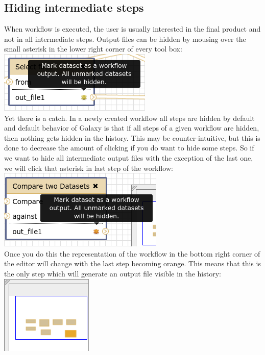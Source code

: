 \documentclass[11pt,a4paper]{article}
\begin{document}
\subsection{Hiding intermediate steps}
When workflow is executed, the user is usually interested in the final product and not in all intermediate steps. Output files can be hidden by mousing over the small asterisk in the lower right corner of every tool box:\\
\includegraphics[scale=0.55]{figures/101_29}\\
Yet there is a catch. In a newly created workflow all steps are hidden by default and default behavior of Galaxy is that if all steps of a given workflow are hidden, then nothing gets hidden in the history. This may be
counter-intuitive, but this is done to decrease the amount of clicking if you do want to hide some steps. So if we want to hide all intermediate output files with the exception of the last one, we will click that asterisk
in last step of the workflow:\\
\includegraphics[scale=0.55]{figures/101_30}\\
Once you do this the representation of the workflow in the bottom right corner of the editor will change with the last step becoming orange. This means that this is the only step which will generate an output file visible in the history:\\
\includegraphics[scale=0.55]{figures/101_31}\\
\end{document}
